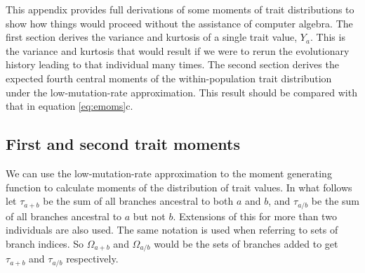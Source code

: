 This appendix provides full derivations of some moments of trait distributions
to show how things would proceed without the assistance of computer algebra. The
first section derives the variance and kurtosis of a single trait value, $Y_a$.
This is the variance and kurtosis that would result if we were to rerun the
evolutionary history leading to that individual many times. The second section
derives the expected fourth central moments of the within-population trait
distribution under the low-mutation-rate approximation. This result should be
compared with that in equation \eqref{eq:emoms}c.

\subsection*{First and second trait moments}

We can use the low-mutation-rate approximation to the moment generating function
to calculate moments of the distribution of trait values. In what follows let
$\tau_{a+b}$ be the sum of all branches ancestral to both $a$ and $b$, and
$\tau_{a/b}$ be the sum of all branches ancestral to $a$ but not $b$. Extensions
of this for more than two individuals are also used. The same notation is used
when referring to sets of branch indices. So $\Omega_{a+b}$ and $\Omega_{a/b}$
would be the sets of branches added to get $\tau_{a+b}$ and $\tau_{a/b}$
respectively.

